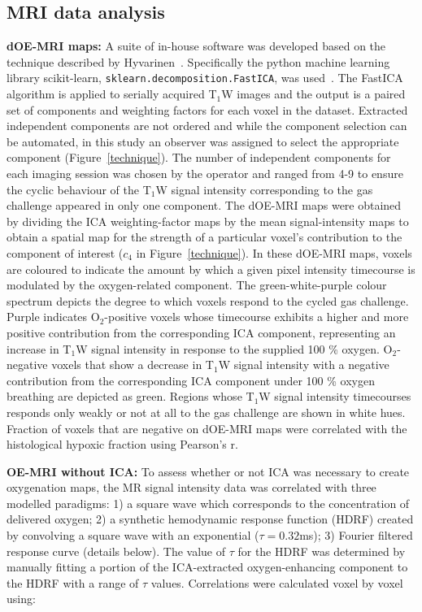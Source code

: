 \subsection{MRI data analysis}
\label{doemri_mrianalysis2}
\textbf{dOE-MRI maps:} A suite of in-house software was developed based on the technique described by Hyvarinen~\cite{Hyvarinen:2000vk}.
Specifically the python machine learning library scikit-learn, \texttt{sklearn.decomposition.FastICA}, was used~\cite{Pedregosa:2011tv}.
The Fast\acs{ICA} algorithm is applied to serially acquired T$_1$W images and the output is a paired set of components and weighting factors for each voxel in the dataset.
Extracted independent components are not ordered and while the component selection can be automated, in this study an observer was assigned to select the appropriate component (Figure~\ref{technique}).
The number of independent components for each imaging session was chosen by the operator and ranged from 4-9 to ensure the cyclic behaviour of the T$_1$W signal intensity corresponding to the gas challenge appeared in only one component. 
The \acs{dOE-MRI} maps were obtained by dividing the \acs{ICA} weighting-factor maps by the mean signal-intensity maps to obtain a spatial map for the strength of a particular voxel's contribution to the component of interest ($c_4$ in Figure~\ref{technique}).
In these \acs{dOE-MRI} maps, voxels are coloured to indicate the amount by which a given pixel intensity timecourse is modulated by the oxygen-related component.  
The green-white-purple colour spectrum depicts the degree to which voxels respond to the cycled gas challenge.
Purple indicates O$_2$-positive voxels whose timecourse exhibits a higher and more positive contribution from the corresponding \acs{ICA} component, representing an increase in T$_1$W signal intensity in response to the supplied 100 \% oxygen. 
O$_2$-negative voxels that show a decrease in T$_1$W signal intensity with a negative contribution from the corresponding \acs{ICA} component under 100 \% oxygen breathing are depicted as green. 
Regions whose T$_1$W signal intensity timecourses responds only weakly or not at all to the gas challenge are shown in white hues.
Fraction of voxels that are negative on \acs{dOE-MRI} maps were correlated with the histological hypoxic fraction using Pearson's r.

\noindent\textbf{OE-MRI without \acs{ICA}:} To assess whether or not \acs{ICA} was necessary to create oxygenation maps, the MR signal intensity data was correlated with three modelled paradigms: 1) a square wave which corresponds to the concentration of delivered oxygen; 2) a synthetic hemodynamic response function (HDRF) created by convolving a square wave with an exponential ($\tau=0.32$ms); 3) Fourier filtered response curve (details below).
The value of $\tau$ for the HDRF was determined by manually fitting a portion of the ICA-extracted oxygen-enhancing component to the HDRF with a range of $\tau$ values.
Correlations were calculated voxel by voxel using:

